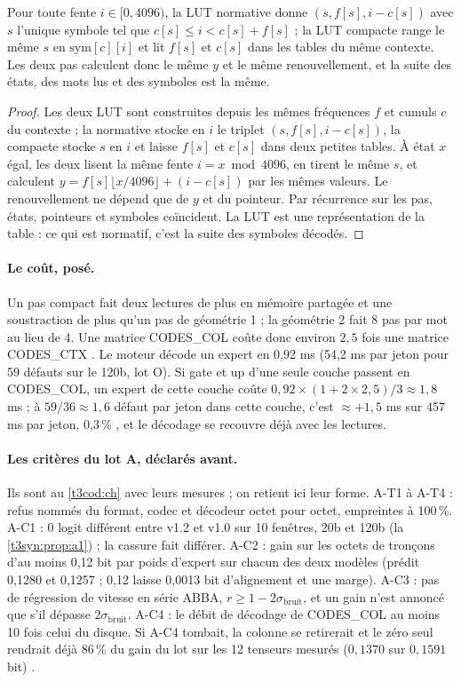 \begin{lemme}\label{t3syn:lem:a2}
Pour toute fente $i \in [0, 4096)$, la LUT normative donne $(s, f[s], i - c[s])$ avec $s$ l'unique symbole tel que $c[s] \le i < c[s] + f[s]$ ; la LUT compacte range le même $s$ en $\mathrm{sym}[c][i]$ et lit $f[s]$ et $c[s]$ dans les tables du même contexte. Les deux pas calculent donc le même $y$ et le même renouvellement, et la suite des états, des mots lus et des symboles est la même.
\end{lemme}

\begin{proof}
Les deux LUT sont construites depuis les mêmes fréquences $f$ et cumuls $c$ du contexte ; la normative stocke en $i$ le triplet $(s, f[s], i - c[s])$, la compacte stocke $s$ en $i$ et laisse $f[s]$ et $c[s]$ dans deux petites tables. À état $x$ égal, les deux lisent la même fente $i = x \bmod 4096$, en tirent le même $s$, et calculent $y = f[s]\lfloor x/4096\rfloor + (i - c[s])$ par les mêmes valeurs. Le renouvellement ne dépend que de $y$ et du pointeur. Par récurrence sur les pas, états, pointeurs et symboles coïncident. La LUT est une représentation de la table : ce qui est normatif, c'est la suite des symboles décodés.
\end{proof}

\paragraph{Le coût, posé.} Un pas compact fait deux lectures de plus en mémoire partagée et une soustraction de plus qu'un pas de géométrie 1 ; la géométrie 2 fait 8 pas par mot au lieu de 4. Une matrice CODES\_COL coûte donc environ $2{,}5$ fois une matrice CODES\_CTX \calc. Le moteur décode un expert en 0,92 ms (54,2 ms par jeton pour 59 défauts sur le 120b, lot O). Si gate et up d'une seule couche passent en CODES\_COL, un expert de cette couche coûte $0{,}92 \times (1 + 2 \times 2{,}5)/3 \approx 1{,}8$ ms ; à $59/36 \approx 1{,}6$ défaut par jeton dans cette couche, c'est $\approx +1{,}5$ ms sur 457 ms par jeton, 0,3\,\% \calc, et le décodage se recouvre déjà avec les lectures.

\paragraph{Les critères du lot A, déclarés avant.} Ils sont au \cref{t3cod:ch} avec leurs mesures ; on retient ici leur forme. A-T1 à A-T4 : refus nommés du format, codec et décodeur octet pour octet, empreintes à 100\,\%. A-C1 : 0 logit différent entre v1.2 et v1.0 sur 10 fenêtres, 20b et 120b (la \cref{t3syn:prop:a1}) ; la cassure fait différer. A-C2 : gain sur les octets de tronçons d'au moins 0,12 bit par poids d'expert sur chacun des deux modèles (prédit 0,1280 et 0,1257 ; 0,12 laisse 0,0013 bit d'alignement et une marge). A-C3 : pas de régression de vitesse en série ABBA, $r \ge 1 - 2\sigma_{\text{bruit}}$, et un gain n'est annoncé que s'il dépasse $2\sigma_{\text{bruit}}$. A-C4 : le débit de décodage de CODES\_COL au moins 10 fois celui du disque. Si A-C4 tombait, la colonne se retirerait et le zéro seul rendrait déjà 86\,\% du gain du lot sur les 12 tenseurs mesurés ($0{,}1370$ sur $0{,}1591$ bit) \calc.

